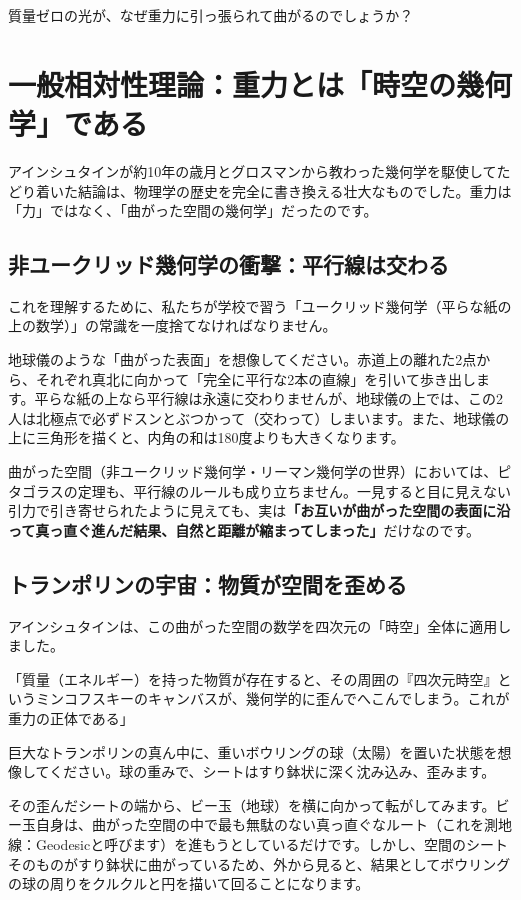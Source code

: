 質量ゼロの光が、なぜ重力に引っ張られて曲がるのでしょうか？

\section{一般相対性理論：重力とは「時空の幾何学」である}

アインシュタインが約10年の歳月とグロスマンから教わった幾何学を駆使してたどり着いた結論は、物理学の歴史を完全に書き換える壮大なものでした。重力は「力」ではなく、「曲がった空間の幾何学」だったのです。

\subsection{非ユークリッド幾何学の衝撃：平行線は交わる}

これを理解するために、私たちが学校で習う「ユークリッド幾何学（平らな紙の上の数学）」の常識を一度捨てなければなりません。

地球儀のような「曲がった表面」を想像してください。赤道上の離れた2点から、それぞれ真北に向かって「完全に平行な2本の直線」を引いて歩き出します。平らな紙の上なら平行線は永遠に交わりませんが、地球儀の上では、この2人は北極点で必ずドスンとぶつかって（交わって）しまいます。また、地球儀の上に三角形を描くと、内角の和は180度よりも大きくなります。

曲がった空間（非ユークリッド幾何学・リーマン幾何学の世界）においては、ピタゴラスの定理も、平行線のルールも成り立ちません。一見すると目に見えない引力で引き寄せられたように見えても、実は\textbf{「お互いが曲がった空間の表面に沿って真っ直ぐ進んだ結果、自然と距離が縮まってしまった」}だけなのです。

\subsection{トランポリンの宇宙：物質が空間を歪める}

アインシュタインは、この曲がった空間の数学を四次元の「時空」全体に適用しました。

「質量（エネルギー）を持った物質が存在すると、その周囲の『四次元時空』というミンコフスキーのキャンバスが、幾何学的に歪んでへこんでしまう。これが重力の正体である」

巨大なトランポリンの真ん中に、重いボウリングの球（太陽）を置いた状態を想像してください。球の重みで、シートはすり鉢状に深く沈み込み、歪みます。

その歪んだシートの端から、ビー玉（地球）を横に向かって転がしてみます。ビー玉自身は、曲がった空間の中で最も無駄のない真っ直ぐなルート（これを測地線：Geodesicと呼びます）を進もうとしているだけです。しかし、空間のシートそのものがすり鉢状に曲がっているため、外から見ると、結果としてボウリングの球の周りをクルクルと円を描いて回ることになります。

